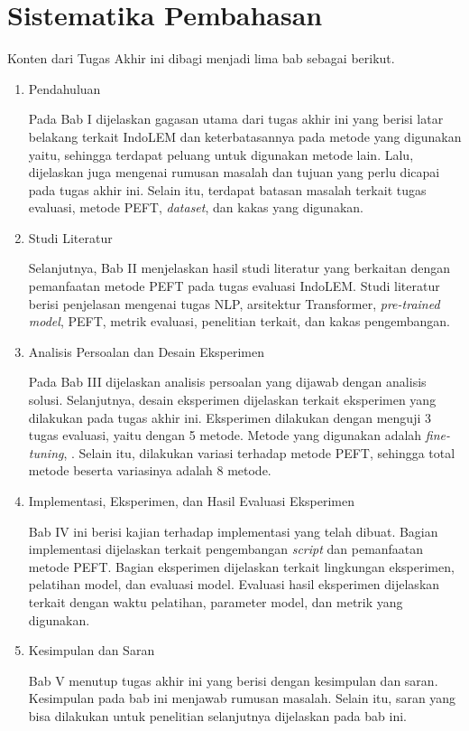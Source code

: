 \section{Sistematika Pembahasan}

Konten dari Tugas Akhir ini  dibagi menjadi lima bab sebagai berikut.
\begin{enumerate}
    \item Pendahuluan

        Pada Bab I dijelaskan gagasan utama dari tugas akhir ini yang berisi latar belakang terkait IndoLEM dan keterbatasannya pada metode yang digunakan yaitu, sehingga terdapat peluang untuk digunakan metode lain. Lalu, dijelaskan juga mengenai rumusan masalah dan tujuan yang perlu dicapai pada tugas akhir ini. Selain itu, terdapat batasan masalah terkait tugas evaluasi, metode PEFT, \textit{dataset}, dan kakas yang digunakan.

    \item Studi Literatur

        Selanjutnya, Bab II  menjelaskan hasil studi literatur yang berkaitan dengan pemanfaatan metode PEFT pada tugas evaluasi IndoLEM. Studi literatur berisi penjelasan mengenai tugas NLP, arsitektur Transformer, \textit{pre-trained model}, PEFT, metrik evaluasi, penelitian terkait, dan kakas pengembangan.

    \item Analisis Persoalan dan Desain Eksperimen

        Pada Bab III  dijelaskan analisis persoalan yang dijawab dengan analisis solusi. Selanjutnya, desain eksperimen dijelaskan terkait eksperimen yang dilakukan pada tugas akhir ini. Eksperimen dilakukan dengan menguji 3 tugas evaluasi, yaitu \nlptask dengan 5 metode. Metode yang digunakan adalah \textit{fine-tuning}, \methodPEFT. Selain itu, dilakukan variasi terhadap metode PEFT, sehingga total metode beserta variasinya adalah 8 metode.

    \item Implementasi, Eksperimen, dan Hasil Evaluasi Eksperimen

        Bab IV ini berisi kajian terhadap implementasi yang telah dibuat. Bagian implementasi dijelaskan terkait pengembangan \textit{script} dan pemanfaatan metode PEFT. Bagian eksperimen dijelaskan terkait lingkungan eksperimen, pelatihan model, dan evaluasi model. Evaluasi hasil eksperimen dijelaskan terkait dengan waktu pelatihan, parameter model, dan metrik yang digunakan.

    \item Kesimpulan dan Saran

        Bab V menutup tugas akhir ini yang berisi dengan kesimpulan dan saran. Kesimpulan pada bab ini menjawab rumusan masalah. Selain itu, saran yang bisa dilakukan untuk penelitian selanjutnya dijelaskan pada bab ini.
\end{enumerate}
